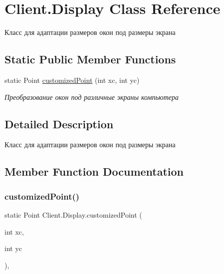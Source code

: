 \hypertarget{class_client_1_1_display}{}\section{Client.\+Display Class Reference}
\label{class_client_1_1_display}


Класс для адаптации размеров окон под размеры экрана  


\subsection*{Static Public Member Functions}
\begin{DoxyCompactItemize}
\item 
static Point \hyperlink{class_client_1_1_display_a205e226e42ca66974f905c8d3c4a0d1c}{customized\+Point} (int xc, int yc)
\begin{DoxyCompactList}\small\item\em Преобразование окон под различные экраны компьютера \end{DoxyCompactList}\end{DoxyCompactItemize}


\subsection{Detailed Description}
Класс для адаптации размеров окон под размеры экрана 



\subsection{Member Function Documentation}
\hypertarget{class_client_1_1_display_a205e226e42ca66974f905c8d3c4a0d1c}{}\label{class_client_1_1_display_a205e226e42ca66974f905c8d3c4a0d1c} 
\subsubsection{\texorpdfstring{customized\+Point()}{customizedPoint()}}
{\footnotesize\ttfamily static Point Client.\+Display.\+customized\+Point (\begin{DoxyParamCaption}\item[{int}]{xc,  }\item[{int}]{yc }\end{DoxyParamCaption})\hspace{0.3cm}{\ttfamily [inline]}, {\ttfamily [static]}}



